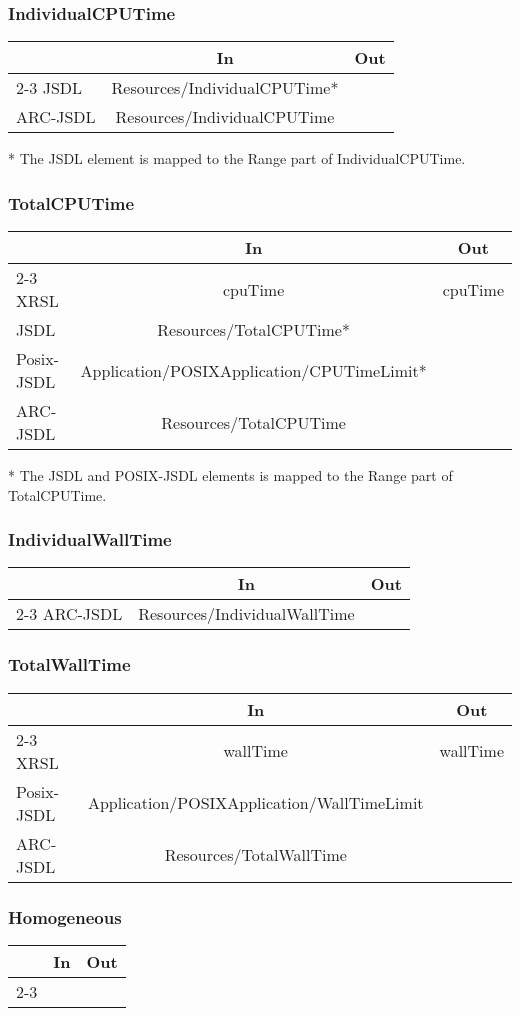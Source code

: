 \documentclass{article}
\newenvironment{inouttabular}%
{\begin{center}\begin{tabular}{l>{\ttfamily\footnotesize}c>{\ttfamily\footnotesize}c}%
\toprule
& \textnormal{\normalsize{In}} & \textnormal{\normalsize{Out}}\\ \cmidrule{2-3}}
{\bottomrule\end{tabular}\end{center}}
\begin{document}
\subsubsection{IndividualCPUTime}
\begin{inouttabular}
JSDL & Resources/IndividualCPUTime* &\\
ARC-JSDL & Resources/IndividualCPUTime &\\
\end{inouttabular}
* The JSDL element is mapped to the Range part of
IndividualCPUTime.

\subsubsection{TotalCPUTime}
\begin{inouttabular}
XRSL & cpuTime & cpuTime\\
JSDL & Resources/TotalCPUTime* &\\
Posix-JSDL & Application/POSIXApplication/CPUTimeLimit* &\\
ARC-JSDL & Resources/TotalCPUTime &\\
\end{inouttabular}
* The JSDL and POSIX-JSDL elements is mapped to the
Range part of TotalCPUTime.

\subsubsection{IndividualWallTime}
\begin{inouttabular}
ARC-JSDL & Resources/IndividualWallTime &\\
\end{inouttabular}

\subsubsection{TotalWallTime}
\begin{inouttabular}
XRSL & wallTime & wallTime\\
Posix-JSDL & Application/POSIXApplication/WallTimeLimit &\\
ARC-JSDL & Resources/TotalWallTime &\\
\end{inouttabular}

\subsubsection{Homogeneous}
\begin{inouttabular}
\end{inouttabular}
\end{document}

